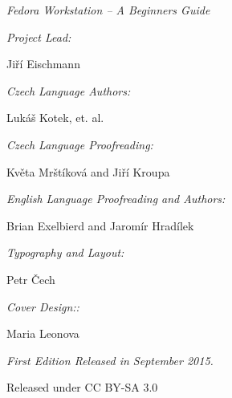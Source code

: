 \newpage\mbox{}\newpage
\begin{center}

{\it\large Fedora Workstation -- A Beginners Guide}

\bigskip

{\it Project Lead:}

Jiří Eischmann

{\it Czech Language Authors:}

Lukáš Kotek, et. al.

{\it Czech Language Proofreading:}

Květa Mrštíková and Jiří Kroupa

{\it English Language Proofreading and Authors:}

Brian Exelbierd and Jaromír Hradílek

{\it Typography and Layout:}

Petr Čech

{\it Cover Design::}

Maria Leonova

{\it First Edition Released in September 2015.

Released under CC BY-SA 3.0}
\end{center}

